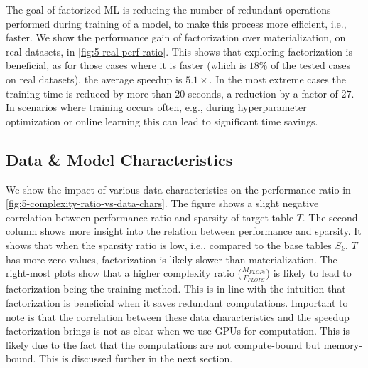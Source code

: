 The goal of factorized ML is reducing the number of redundant operations performed during training of a model, to make this process more efficient, i.e., faster. We show the performance gain of factorization over materialization, on real datasets, in \autoref{fig:5-real-perf-ratio}. This shows that exploring factorization is beneficial, as for those cases where it is faster (which is $18\%$ of the tested cases on real datasets), the average speedup is $5.1\times$. In the most extreme cases the training time is reduced by more than $20$ seconds, a reduction by a factor of $27$. In scenarios where training occurs often, e.g., during hyperparameter optimization or online learning this can lead to significant time savings.


\subsection{Data \& Model Characteristics}
We show the impact of various data characteristics on the performance ratio in \autoref{fig:5-complexity-ratio-vs-data-chars}. The figure shows a slight negative correlation between performance ratio and sparsity of target table $T$. The second column shows more insight into the relation between performance and sparsity. It shows that when the sparsity ratio is low, i.e., compared to the base tables $S_k$, $T$ has more zero values, factorization is likely slower than materialization. The right-most plots show that a higher complexity ratio ($\frac{M_{FLOPs}}{F_{FLOPS}}$) is likely to lead to factorization being the training method. This is in line with the intuition that factorization is beneficial when it saves redundant computations. Important to note is that the correlation between these data characteristics and the speedup factorization brings is not as clear when we use GPUs for computation. This is likely due to the fact that the computations are not compute-bound but memory-bound. This is discussed further in the next section.

